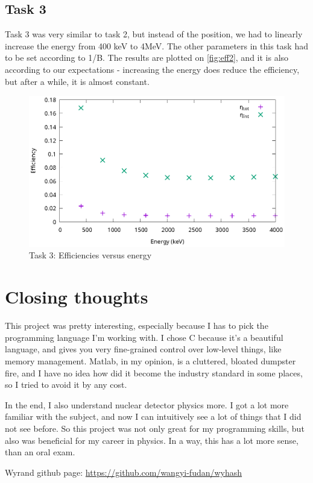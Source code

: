 \documentclass[a4paper,12pt]{article}
\begin{document}
\newpage
\phantom{asdasd}
\newpage

\subsection{Task 3}
Task 3 was very similar to task 2, but instead of the position, we had to linearly increase the energy from 400 keV to 4MeV. The other parameters in this task had to be set according to 1/B. The results are plotted on \autoref{fig:eff2}, and it is also according to our expectations - increasing the energy does reduce the efficiency, but after a while, it is almost constant.

\begin{figure}[h!]
\centering
\includegraphics[width=\textwidth]{./3.eps}
\caption{Task 3: Efficiencies versus energy}
\label{fig:eff2}
\end{figure}

\section{Closing thoughts}
This project was pretty interesting, especially because I has to pick the programming language I'm working with. I chose C because it's a beautiful language, and gives you very fine-grained control over low-level things, like memory management. Matlab, in my opinion, is a cluttered, bloated dumpster fire, and I have no idea how did it become the industry standard in some places, so I tried to avoid it by any cost.

In the end, I also understand nuclear detector physics more. I got a lot more familiar with the subject, and now I can intuitively see a lot of things that I did not see before. So this project was not only great for my programming skills, but also was beneficial for my career in physics. In a way, this has a lot more sense, than an oral exam.

\begin{thebibliography}{1}
 Wyrand github page: \href{https://github.com/wangyi-fudan/wyhash}{https://github.com/wangyi-fudan/wyhash}
\end{thebibliography}
\end{document}
